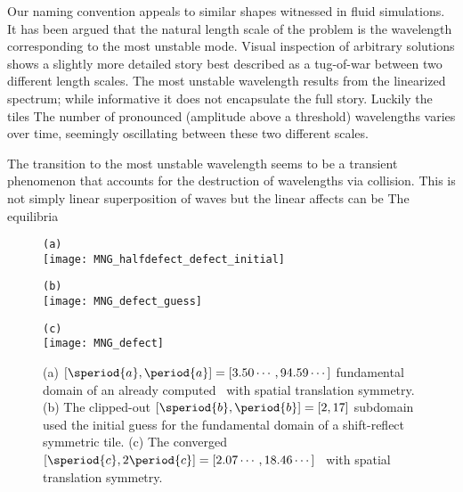 \begin{itemize}
{Our
naming convention appeals to similar shapes witnessed in fluid simulations.
It has been argued that the natural length scale of the problem is the wavelength
corresponding to the most unstable mode. Visual inspection of arbitrary
solutions shows a slightly more detailed story best described as a tug-of-war between two
different length scales. The most unstable wavelength results from the linearized
spectrum; while informative it does not encapsulate the full story. Luckily the
tiles The number of pronounced (amplitude above a threshold)
wavelengths varies over time, seemingly oscillating between these two different scales.

The transition to the
most unstable wavelength seems to be a transient phenomenon that accounts for
the destruction of wavelengths via collision. This is not simply linear
superposition of waves but the linear affects can be
The equilibria

\begin{figure}
\begin{minipage}[height=.4\textheight]{.5\textwidth}
\centering \small{\texttt{(a)}}\\
\texttt{[image: MNG\_halfdefect\_defect\_initial]}
\end{minipage}
\begin{minipage}[height=.4\textheight]{.5\textwidth}
\centering \small{\texttt{(b)}}\\
\texttt{[image: MNG\_defect\_guess]}
\end{minipage}
\begin{minipage}[height=.1\textheight]{\textwidth}
\centering \small{\texttt{(c)}}\\
\texttt{[image: MNG\_defect]}
\end{minipage}
\caption{ \label{fig:defect}
(a)
$[\speriod{a},\period{a}]=[3.50\cdots,94.59\cdots]$ fundamental domain
of an already computed \twot\ with spatial translation symmetry.
(b)
The clipped-out $[\speriod{b},\period{b}]=[2,17]$ subdomain used the
initial guess for the fundamental domain of a shift-reflect symmetric tile.
(c)
The converged $[\speriod{c},2\period{c}]=[2.07\cdots,18.46\cdots]$ \twot\
with spatial translation symmetry.
}
\end{figure}

}
\end{itemize}

